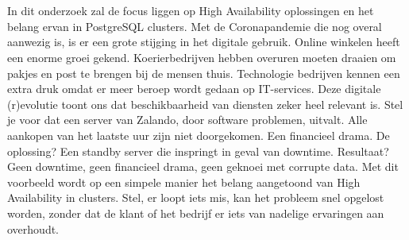 \chapter{}
\label{ch:inleiding}



\section{}
\label{sec:probleemstelling}

In dit onderzoek zal de focus liggen op High Availability oplossingen en het belang ervan in PostgreSQL clusters. Met de Coronapandemie die nog overal aanwezig is, is er een grote stijging in het digitale gebruik. Online winkelen heeft een enorme groei gekend. Koerierbedrijven hebben overuren moeten draaien om pakjes en post te brengen bij de mensen thuis. Technologie bedrijven kennen een extra druk omdat er meer beroep wordt gedaan op IT-services. Deze digitale (r)evolutie toont ons dat beschikbaarheid van diensten zeker heel relevant is. Stel je voor dat een server van Zalando, door software problemen, uitvalt. Alle aankopen van het laatste uur zijn niet doorgekomen. Een financieel drama. De oplossing? Een standby server die inspringt in geval van downtime. Resultaat? Geen downtime, geen financieel drama, geen geknoei met corrupte data. Met dit voorbeeld wordt op een simpele manier het belang aangetoond van High Availability in clusters. Stel, er loopt iets mis, kan het probleem snel opgelost worden, zonder dat de klant of het bedrijf er iets van nadelige ervaringen aan overhoudt.

